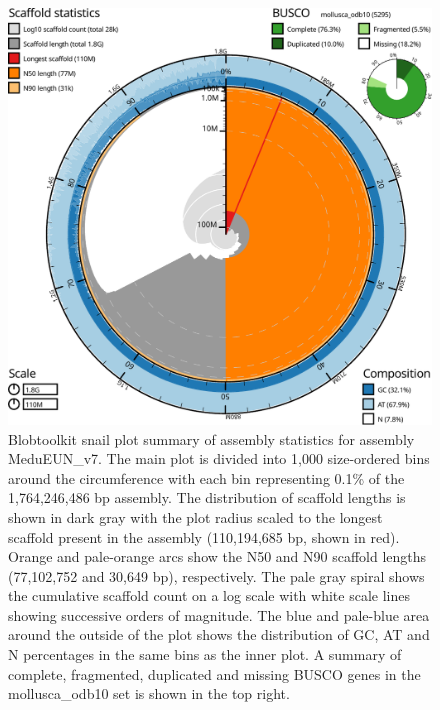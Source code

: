 \documentclass[11pt, a4paper]{article}
\begin{document}
\begin{figure}
	\includegraphics[width=\linewidth]{figures/btk_snail_MeduEUN_v7}
	\caption{Blobtoolkit snail plot summary of assembly statistics for assembly MeduEUN\_v7. The main plot is divided into 1,000 size-ordered bins around the circumference with each bin representing 0.1\% of the 1,764,246,486 bp assembly. The distribution of scaffold lengths is shown in dark gray with the plot radius scaled to the longest scaffold present in the assembly (110,194,685 bp, shown in red). Orange and pale-orange arcs show the N50 and N90 scaffold lengths (77,102,752 and 30,649 bp), respectively. The pale gray spiral shows the cumulative scaffold count on a log scale with white scale lines showing successive orders of magnitude. The blue and pale-blue area around the outside of the plot shows the distribution of GC, AT and N percentages in the same bins as the inner plot. A summary of complete, fragmented, duplicated and missing BUSCO genes in the mollusca\_odb10 set is shown in the top right.}
	\label{supfig:btk-snail-MeduEUN}
\end{figure}
\end{document}
